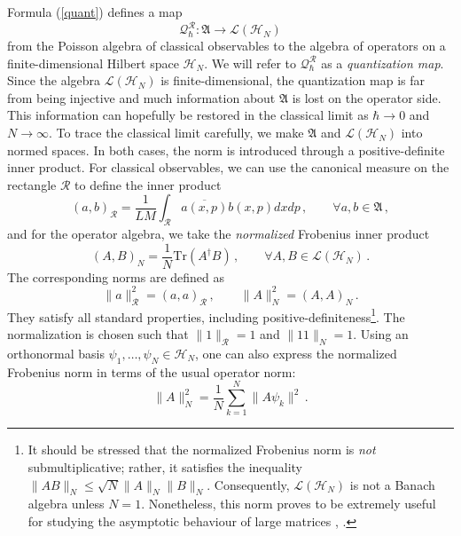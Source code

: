 \documentclass[12pt,a4paper]{article}
\numberwithin{equation}{section}
\theoremstyle{theorem}
\theoremstyle{remark}
\newcommand{\R}{\mathcal{R}}
\newcommand{\hh}{\mathcal{H}}
\newcommand{\hn}{\mathcal{H}_N}
\newcommand{\fa}{\mathfrak{A}}
\newcommand{\qq}{\mathcal{Q}_{\hbar}}
\newcommand{\I}{1\!\! 1}
\begin{document}
         Formula (\ref{quant}) defines a map 
\begin{equation}\label{QM}
\qq^\R: \fa\rightarrow \mathscr{L}(\hn)
\end{equation}from the Poisson algebra of classical observables to the algebra of operators on a finite-dimensional Hilbert space $\hh_N$. We will refer to $\qq^\R$ as a {\it quantization  map}. Since the algebra $\mathscr{L}(\hn)$ is finite-dimensional, the quantization map is far from being injective and much information about $\fa$ is lost on the operator side. This information can hopefully be restored in the classical limit as $\hbar\to 0$ and $N \to \infty$. 
         To trace the classical limit carefully, we make $\fa$ and $\mathscr{L}(\hn)$ into normed spaces. In both cases, the norm is introduced through a positive-definite inner product. For classical observables, we can use the canonical measure on the rectangle $\R$ to define the inner product
         \begin{equation}
             (a,b)_\R=\frac{1}{LM}\int_\R\overline{ a(x,p)} b(x,p)dxdp\,,\qquad \forall a,b\in \fa\,,
         \end{equation}
         and for the operator algebra, we take the {\it normalized} Frobenius inner product 
         \begin{equation}\label{FN}
             (A,B)_N=\frac1{N}\mathrm{Tr}(A^\dagger B)\,,\qquad \forall A,B\in \mathscr{L}(\hn)\,.
         \end{equation}
The corresponding norms are defined as
         \begin{equation}
             \|a\|_\R^2=(a,a)_\R\,,\qquad \|A\|^2_N=({A},{A})_N\,.
         \end{equation}
They satisfy all standard properties, including positive-definiteness\footnote{It should be stressed that the normalized Frobenius norm is {\it not} submultiplicative; rather, it satisfies the inequality $\|A B\|_N\leq \sqrt{N}\|A\|_N \|B\|_N$. Consequently, $\mathscr{L}(\hn)$ is not a Banach  algebra unless $N=1$. Nonetheless, this norm proves to be extremely useful for  studying the asymptotic behaviour of large matrices \cite{vonNeumann1942}, \cite{ CIT-006 }.\label{f1} }. The normalization is chosen such that $\|1\|_\R=1$ and $\|\I\|_N=1$.  Using an orthonormal basis $\psi_1,\ldots,\psi_N\in \hh_N$, one can also express the normalized Frobenius norm in terms of the usual operator norm:
\begin{equation}
    \|A\|^2_N=\frac1N\sum_{k=1}^N\|A\psi_k\|^2\,.
\end{equation}
\end{document}
